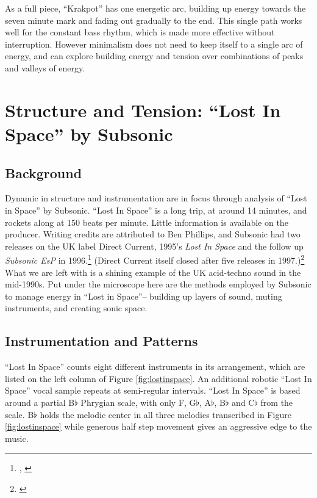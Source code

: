 \documentclass[12pt,twoside]{reedthesis}
\begin{document}
As a full piece, ``Krakpot'' has one energetic arc, building up energy towards the seven minute mark and fading out gradually to the end. This single path works well for the constant bass rhythm, which is made more effective without interruption. However minimalism does not need to keep itself to a single arc of energy, and can explore building energy and tension over combinations of peaks and valleys of energy.  

\newpage
\section{Structure and Tension: ``Lost In Space'' by Subsonic}
\label{sec:lostinspace}

\subsection{Background}

Dynamic in structure and instrumentation are in focus through analysis of ``Lost in Space'' by Subsonic. ``Lost In Space'' is a long trip, at around 14 minutes, and rockets along at 150 beats per minute. Little information is available on the producer. Writing credits are attributed to Ben Phillips, and Subsonic had two releases on the UK label Direct Current, 1995's \emph{Lost In Space} and the follow up \emph{Subsonic EsP} in 1996.\footnote{\cite{SubsonicSubsonicEsP}, \cite{subsonicLostInSpace1995}} (Direct Current itself closed after five releases in 1997.)\footnote{\cite{DirectCurrent}} What we are left with is a shining example of the UK acid-techno sound in the mid-1990s. Put under the microscope here are the methods employed by Subsonic to manage energy in ``Lost in Space''-- building up layers of sound, muting instruments, and creating sonic space.

\subsection{Instrumentation and Patterns}

``Lost In Space'' counts eight different instruments in its arrangement, which are listed on the left column of Figure \ref{fig:lostinspace}. An additional robotic ``Lost In Space'' vocal sample repeats at semi-regular intervals. ``Lost In Space'' is based around a partial B$\flat$ Phrygian scale, with only F, G$\flat$, A$\flat$, B$\flat$ and C$\flat$ from the scale. B$\flat$ holds the melodic center in all three melodies transcribed in Figure \ref{fig:lostinspace} while generous half step movement gives an aggressive edge to the music.
\end{document}
